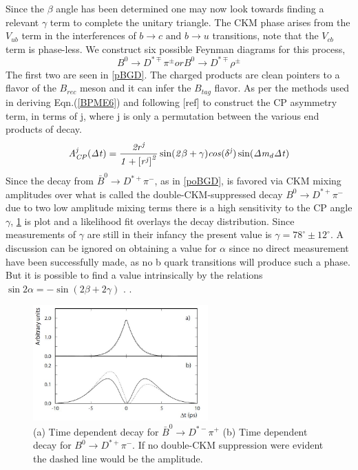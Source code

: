 Since the $\beta$ angle has been determined one may now look towards finding a relevant $\gamma$ term to complete the unitary triangle. The CKM phase arises from the $V_{ub}$ term in the interferences of $b\rightarrow c \mbox{ and } b \rightarrow u$ transitions, note that the $V_{cb}$ term is phase-less. We construct six possible Feynman diagrams for this process,
\begin{equation}\label{BPME22}
B^0 \rightarrow D^{*\mp}\pi^{\pm} or B^0 \rightarrow D^{*\mp}\rho^{\pm} 
\end{equation}
The first two are seen in \cref{pBGD}. The charged products are clean pointers to a flavor of the $B_{rec}$ meson and it can infer the $B_{tag}$ flavor. As per the methods used in deriving Eqn.(\ref{BPME6}) and following [ref] to construct the CP asymmetry term, in terms of j, where j is only a permutation between the various end products of decay.
\begin{equation}\label{BPME23}
\it{A}^{j}_{\it{CP}}(\Delta t) = \frac{2r^j}{1+\left[r^j\right]^2}\sin(2 \beta +\gamma)cos(\delta^j)\sin(\Delta m_d \Delta t)
\end{equation}
Since the decay \cite{B7} from $\bar{B}^0 \rightarrow D^{*+}\pi^{-}$, as in \cref{poBGD}, is favored via CKM mixing amplitudes over what is called the double-CKM-suppressed decay $B^0 \rightarrow D^{*+}\pi^{-}$ due to two low amplitude mixing terms there is a high sensitivity to the CP angle $\gamma$, \cref{kino1} is plot and a likelihood fit overlays the decay distribution. Since measurements of $\gamma$ are still in their infancy the present value is $\gamma = 78^{\circ}\pm12^{\circ}$. A discussion can be ignored on obtaining a value for $\alpha$ since no direct measurement have been successfully made, as no b quark transitions will produce such a phase. But it is possible to find a value intrinsically by the relations $\sin2\alpha = - \sin(2\beta +2\gamma)$ .\cite{B17} .

 \begin{figure}[h]
\centering
\includegraphics[width=0.6\textwidth]{figs/kino.JPG}
\caption{(a) Time dependent decay for $\bar{B}^0 \rightarrow D^{*-}\pi^{+}$ (b) Time dependent decay for $B^0 \rightarrow D^{*+}\pi^{-}$. If no double-CKM suppression were evident the dashed line would be the amplitude.}
\label{kino1}
\end{figure}

